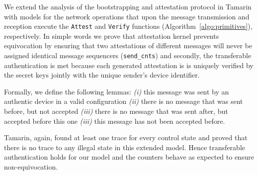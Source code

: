  We extend the analysis of the bootstrapping and attestation protocol in Tamarin with models for the network operations that upon the message transmission and reception execute the {\tt Attest} and {\tt Verify} functions (Algorithm~\ref{algo:primitives}), respectively. In simple words we prove that  \projecttitle{} attestation kernel prevents equivocation by ensuring that two attestations of different messages will never be assigned identical message sequencers ({\tt send\_cnts}) and secondly, the transferable authentication is met because each generated attestation is is uniquely verified by the secret keys jointly with the unique sender's \projecttitle{} device identifier.

Formally, we define the following lemmas: \emph{(i)} this message was sent by an authentic \projecttitle{} device in a valid configuration \emph{(ii)} there is no message that was sent before, but not accepted \emph{(iii)} there is no message that was sent after, but accepted before this one \emph{(iii)} this message has not been accepted before.

Tamarin, again, found at least one trace for every control state and proved that there is no trace to any illegal state in this extended model. Hence transferable authentication holds for our model and the counters behave as expected to ensure non-equivocation. 


